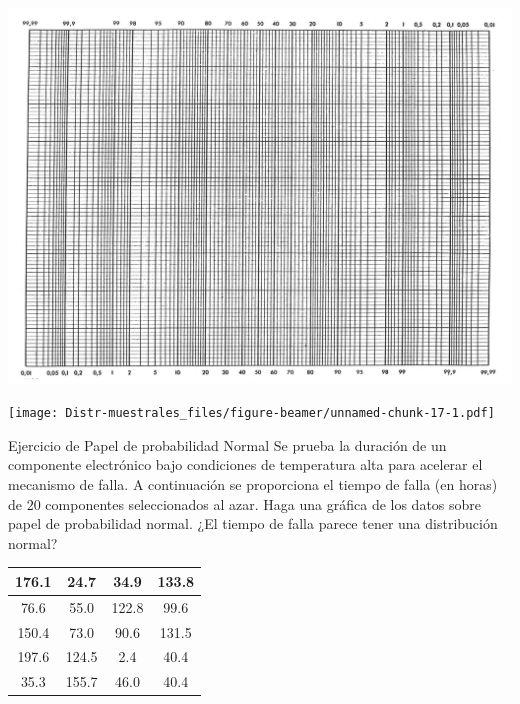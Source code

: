 \documentclass[
  10pt,
  ignorenonframetext,
]{beamer}
\begin{document}
\begin{frame}{}
\begin{minipage}{\textwidth}
\begin{multicols}{2}
\end{multicols}

\end{minipage}
\end{frame}

\begin{frame}{}
\protect\hypertarget{section-39}{}
\includegraphics{figuras/probpaperLandscape.png}
\end{frame}

\begin{frame}{}
\protect\hypertarget{section-40}{}
\texttt{[image: Distr-muestrales\_files/figure-beamer/unnamed-chunk-17-1.pdf]}
\end{frame}

\begin{frame}{}
\protect\hypertarget{section-41}{}
\begin{block}{Ejercicio de Papel de probabilidad Normal}
\protect\hypertarget{ejercicio-de-papel-de-probabilidad-normal}{}
Se prueba la duración de un componente electrónico bajo condiciones de
temperatura alta para acelerar el mecanismo de falla. A continuación se
proporciona el tiempo de falla (en horas) de \(20\) componentes
seleccionados al azar. Haga una gráfica de los datos sobre papel de
probabilidad normal. ¿El tiempo de falla parece tener una distribución
normal?

\begin{table}
\centering\begingroup\fontsize{9}{11}\selectfont

\begin{tabular}{c|c|c|c}
\hline
176.1 & 24.7 & 34.9 & 133.8\\
\hline
76.6 & 55.0 & 122.8 & 99.6\\
\hline
150.4 & 73.0 & 90.6 & 131.5\\
\hline
197.6 & 124.5 & 2.4 & 40.4\\
\hline
35.3 & 155.7 & 46.0 & 40.4\\
\hline
\end{tabular}
\endgroup{}
\end{table}
\end{block}
\end{frame}
\end{document}
